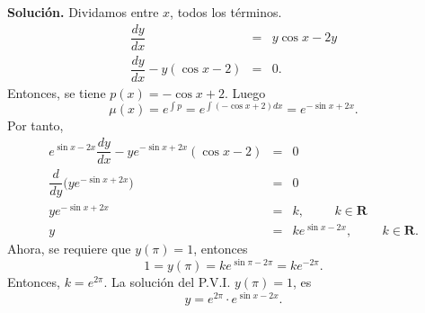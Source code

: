 \documentclass[10pt,a5paper]{article}
\begin{document}
\begin{enumerate}
		\textbf{Solución.} Dividamos entre \(x\), todos los términos.
		\[
			\begin{array}{rcl}
				\dfrac{dy}{dx} &=& y \cos x-2y \\[2mm]
				\dfrac{dy}{dx} -y(\cos x-2) & = & 0.
			\end{array}
		\]
		Entonces, se tiene \(p(x) = -\cos x+2\). Luego
		\[
			\mu (x) = e^{\int p} = e^{\int (-\cos x+2) dx} = e^{-\sin x+2x}.
		\]
		Por tanto,
		\[
			\begin{array}{rcl}
				e^{\sin x-2x} \dfrac{dy}{dx} -ye^{- \sin x+2x} (\cos x-2) & = & 0 \\[5mm]
				\dfrac{d}{dy} \big(ye^{- \sin x+2x}\big) & = & 0\\[5mm]
				ye^{- \sin x+2x} & = & k, \hspace{1cm} k \in \mathbf{R} \\[5mm]
				y & = & ke^{\sin x-2x} , \hspace{1cm} k \in \mathbf{R}.
			\end{array}
		\]
		Ahora, se requiere que \(y(\pi) =1\), entonces
		\[
			1 = y(\pi) = ke^{\sin \pi -2 \pi} = ke^{-2 \pi}.
		\]
		Entonces, \(k=e^{2 \pi}\). La solución del P.V.I. \(y(\pi) =1\), es
		\[
			y = e^{2 \pi} \cdot e^{\sin x-2x}.
		\]
\end{enumerate}
\end{document}
